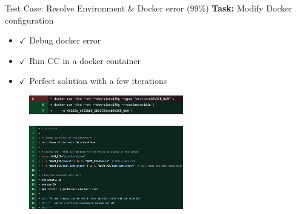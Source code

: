 \documentclass[aspectratio=169]{beamer}
\begin{document}
\begin{frame}[fragile]{Test Case: Resolve Environment \& Docker error (99\%)}
	\textbf{Task:} Modify Docker configuration
	\begin{itemize}
		\item $\checkmark$ Debug docker error
		\item $\checkmark$ Run CC in a docker container
		\item $\checkmark$ Perfect solution with a few iterations
	\end{itemize}
	
	\begin{figure}
		\includegraphics[width=0.6\textwidth]{fig/docker1.jpg}
	\end{figure}
	\begin{figure}
		\includegraphics[width=0.6\textwidth]{fig/docker2.jpg}
	\end{figure}
\end{frame}
\end{document}

